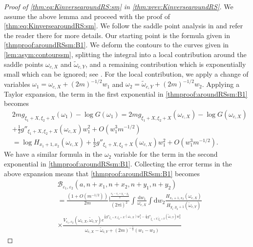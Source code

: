 \documentclass[11pt,twoside]{amsart}
\theoremstyle{plain}
\numberwithin{quest}{section}
\theoremstyle{remark}
\numberwithin{rem}{section}
\theoremstyle{definition}
\newcommand{\eps}{\varepsilon}
\begin{document}
\begin{proof}[Proof of \eqref{thm:eq:KinversearoundRS:sm} in
		\cref{thm:prev:KinversearoundRS}]
        
		We assume the above lemma and proceed with the proof of \eqref{thm:eq:KinversearoundRS:sm}. We follow the saddle point analysis in \cite[Proposition 3.12]{CJ16} and refer the reader there for more details.  Our starting point is the formula given in \eqref{thmproof:aroundRSsm:B1}.   We deform the contours to the curves given in \cref{lem:asym:contourssm}, splitting the integral into a local contribution around the saddle points $\omega_{c,X}$ and $\tilde{\omega}_{c,Y}$, and a remaining contribution which is exponentially small which can be ignored; see \cite[Proposition 3.12]{CJ16}.  For the local contribution, we apply a change of variables $\omega_1=\omega_{c,X}+(2m)^{-1/2}w_1$ and $\omega_2=\tilde{\omega}_{c,Y}+(2m)^{-1/2}w_2$. Applying a Taylor expansion, the term in the first exponential in \eqref{thmproof:aroundRSsm:B1} becomes
		\begin{equation*}
			\begin{split}
				&2m g_{\xi_1+X,\xi_2+X}(\omega_1) -\log G(\omega_1) =
				2m g_{\xi_1+X,\xi_2+X}(\omega_{c,X}) -\log G(\omega_{c,X})\\
				& +\frac{1}{2}g''_{\xi_1+X,\xi_2+X}(\omega_{c,X})w_1^2+O(w_1^3m^{-1/2})\\
				&=\log H_{x_1+1,x_2}(\omega_{c,X})+\frac{1}{2}g''_{\xi_1+X,\xi_2+X}(\omega_{c,X})w_1^2+O(w_1^3m^{-1/2}).
			\end{split}
		\end{equation*}
		We have a similar formula in the $\omega_2$ variable for the term in the second exponential in \eqref{thmproof:aroundRSsm:B1}. Collecting the error terms in the above expansion means that \eqref{thmproof:aroundRSsm:B1} becomes
		\begin{equation}
			\begin{split}\label{thmproof:aroundRSsm:B2}
				&\mathcal{B}_{\eps_1,\eps_2}(a,n+x_1,n+x_2,n+y_1,n+y_2)\\&=\frac{(1+O(m^{-1/2}))}{2m}\frac{\mathrm{i}^{\frac{x_2-x_1+y_1-y_2}{2}}}{(2\pi \mathrm{i})^2} \int \frac{\mathrm{d}w_1}{\omega_{c,X}} \int \mathrm{d}w_2 \frac{H_{x_1+1,x_2}(\omega_{c,X})}{H_{y_1,y_2+1}(\tilde{\omega}_{c,Y})}\\
				&\times \frac{V_{\eps_1,\eps_2}(\omega_{c,X},\tilde{\omega}_{c,Y})e^{\frac{1}{2}g''_{\xi_1+X,\xi_2+X}(\omega_{c,X})w_1^2-\frac{1}{2}g''_{\tilde{\xi}_1+Y,\tilde{\xi}_2+Y}(\tilde{\omega}_{c,Y})w_2^2}}{\omega_{c,X} - \tilde{\omega}_{c,Y}+(2m)^{-\frac{1}{2}}(w_1-w_2)}  
			\end{split}
		\end{equation}

\end{proof}
\end{document}
